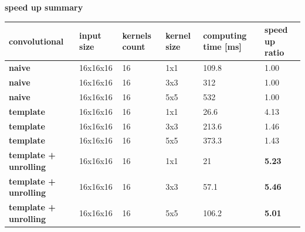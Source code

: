 \documentclass[xcolor=dvipsnames]{beamer}
\begin{document}
\begin{frame}{\bf speed up summary}

  \begin{table}[]
    \tiny
    \begin{tabular}{|l|l|l|l|l|l|}
    \hline
    \textbf{convolutional}                               & \textbf{input size} & \textbf{kernels count} & \textbf{kernel size} & \textbf{computing time {[}ms{]}} & \textbf{speed up ratio} \\ \hline
    {\color[HTML]{9AFF99} \textbf{naive}}                & 16x16x16            & 16                     & 1x1                  & 109.8                            & 1.00                    \\ \hline
    {\color[HTML]{9AFF99} \textbf{naive}}                & 16x16x16            & 16                     & 3x3                  & 312                              & 1.00                    \\ \hline
    {\color[HTML]{9AFF99} \textbf{naive}}                & 16x16x16            & 16                     & 5x5                  & 532                              & 1.00                    \\ \hline
    {\color[HTML]{96FFFB} \textbf{template}}             & 16x16x16            & 16                     & 1x1                  & 26.6                             & 4.13                    \\ \hline
    {\color[HTML]{96FFFB} \textbf{template}}             & 16x16x16            & 16                     & 3x3                  & 213.6                            & 1.46                    \\ \hline
    {\color[HTML]{96FFFB} \textbf{template}}             & 16x16x16            & 16                     & 5x5                  & 373.3                            & 1.43                    \\ \hline
    {\color[HTML]{FD6864} \textbf{template + unrolling}} & 16x16x16            & 16                     & 1x1                  & 21                               & \textbf{5.23}           \\ \hline
    {\color[HTML]{FD6864} \textbf{template + unrolling}} & 16x16x16            & 16                     & 3x3                  & 57.1                             & \textbf{5.46}           \\ \hline
    {\color[HTML]{FD6864} \textbf{template + unrolling}} & 16x16x16            & 16                     & 5x5                  & 106.2                            & \textbf{5.01}           \\ \hline
    \end{tabular}
  \end{table}

\end{frame}
\end{document}
